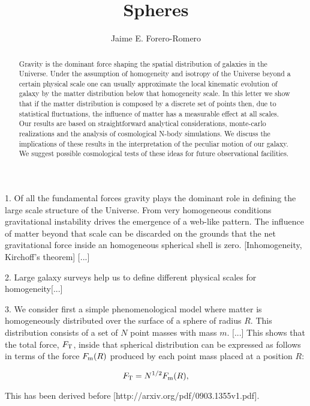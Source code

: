 \documentclass{article}
\title{Spheres}
\author{Jaime E. Forero-Romero}
\begin{document}
\maketitle
\begin{abstract}

Gravity is the dominant force shaping the spatial distribution of galaxies in
the Universe. Under the assumption of homogeneity and isotropy of the Universe
beyond a certain physical scale one can usually approximate the local
kinematic evolution of galaxy by the matter distribution below that
homogeneity scale. In this letter we show that if the matter
distribution is composed by a discrete set of points then, due to
statistical fluctuations, the influence of matter has a measurable
effect at all scales. Our results are based on straightforward
analytical considerations, monte-carlo realizations and the analysis
of cosmological N-body simulations. We discuss the implications of
these results in the interpretation of the peculiar motion of our
galaxy. We suggest possible cosmological tests of these ideas for
future observational facilities. 



\end{abstract}

1. Of all the fundamental forces gravity plays the dominant role in
defining the large scale structure of the Universe. From very
homogeneous conditions gravitational instability drives the emergence
of a web-like pattern. The influence of
matter beyond that scale can be discarded on the grounds that
the net gravitational force inside an homogeneous spherical
shell is zero. [Inhomogeneity, Kirchoff's theorem] [...]



2. Large galaxy surveys help us to define different physical scales for
homogeneity[...]


3. We consider first a simple phenomenological model where matter is
homogeneously distributed over the surface of a sphere of radius
$R$. This distribution consists of a set of $N$ point masses with mass
$m$. [...] This shows that the total force, $F_{\rm T}$, inside that spherical
distribution can be expressed as follows in terms of the force $F_{\rm
m}(R)$ produced by each point mass placed at a position $R$:

\begin{equation}
F_{\rm T } = N^{1/2} F_{\rm m} (R),
\end{equation}

This has been derived before [http://arxiv.org/pdf/0903.1355v1.pdf].
\end{document}
